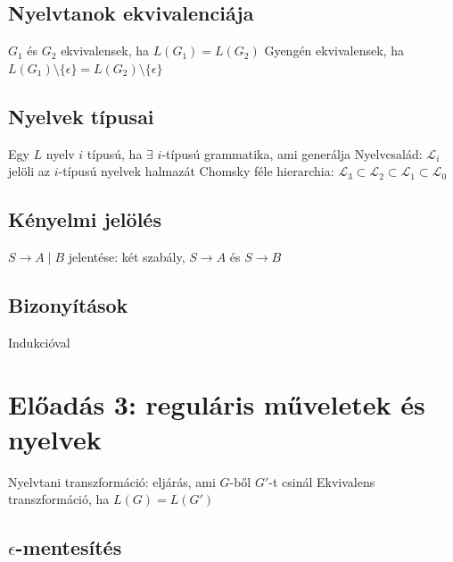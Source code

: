 \documentclass[12pt,a4paper]{article}
\begin{document}
\subsection{Nyelvtanok ekvivalenciája}

\begin{outline}
	\1 $G_1$ és $G_2$ ekvivalensek, ha $L(G_1) = L(G_2)$
	\1 Gyengén ekvivalensek, ha $L(G_1) \setminus \{\epsilon\} = L(G_2) \setminus \{\epsilon\}$
\end{outline}

\subsection{Nyelvek típusai}

\begin{outline}
	\1 Egy $L$ nyelv $i$ típusú, ha $\exists$ $i$-típusú grammatika, ami generálja
	\1 Nyelvcsalád: $\mathcal{L}_i$ jelöli az $i$-típusú nyelvek halmazát
	\1 Chomsky féle hierarchia: $\mathcal{L}_3 \subset \mathcal{L}_2 \subset \mathcal{L}_1 \subset \mathcal{L}_0$
\end{outline}

\subsection{Kényelmi jelölés}

\begin{outline}
	\1 $S \to A \;|\; B$ jelentése: két szabály, $S \to A$ és $S \to B$
\end{outline}

\subsection{Bizonyítások}

\begin{outline}
	\1 Indukcióval
\end{outline}

\pagebreak

\section{Előadás 3: reguláris műveletek és nyelvek}

\begin{outline}
	\1 Nyelvtani transzformáció: eljárás, ami $G$-ből $G'$-t csinál
		\2 Ekvivalens transzformáció, ha $L(G) = L(G')$
\end{outline}

\subsection{$\epsilon$-mentesítés}
\end{document}
